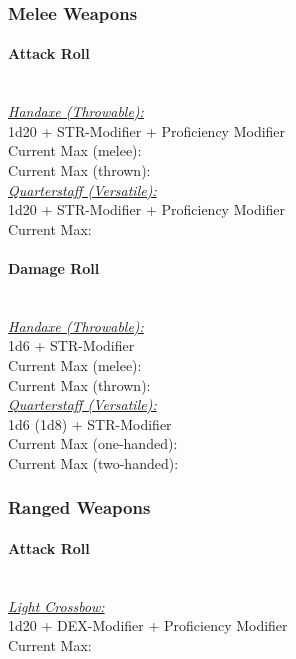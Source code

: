 \documentclass[letterpaper,openany,oneside,twocolumn]{book}
\begin{document}
\subsubsection*{Melee Weapons}
\paragraph*{Attack Roll}\hfill\\
\underline{\textit{Handaxe (Throwable):}}\\
1d20 + STR-Modifier + Proficiency Modifier\\
\indent Current Max (melee): \\
\indent Current Max (thrown): 
\\
\underline{\textit{Quarterstaff (Versatile):}}\\
1d20 + STR-Modifier + Proficiency Modifier\\
\indent Current Max: 
\paragraph*{Damage Roll}\hfill\\
\underline{\textit{Handaxe (Throwable):}}\\
1d6 + STR-Modifier\\
\indent Current Max (melee): \\
\indent Current Max (thrown): 
\\
\underline{\textit{Quarterstaff (Versatile):}}\\
1d6 (1d8) + STR-Modifier\\
\indent Current Max (one-handed): \\
\indent Current Max (two-handed): 
\subsubsection*{Ranged Weapons}
\paragraph*{Attack Roll}\hfill\\
\underline{\textit{Light Crossbow:}}\\
1d20 + DEX-Modifier + Proficiency Modifier\\
\indent Current Max: 
\end{document}
